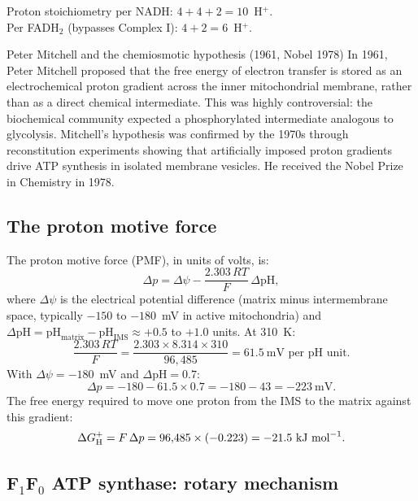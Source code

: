 \documentclass[12pt, a4paper, oneside]{report}
\begin{document}
Proton stoichiometry per NADH: $4 + 4 + 2 = 10$~H$^+$.\\
Per FADH$_2$ (bypasses Complex I): $4 + 2 = 6$~H$^+$.

\begin{historicalnote}{Peter Mitchell and the chemiosmotic hypothesis (1961, Nobel 1978)}
  In 1961, Peter Mitchell proposed that the free energy of electron
  transfer is stored as an electrochemical proton gradient across the
  inner mitochondrial membrane, rather than as a direct chemical
  intermediate. This was highly controversial: the biochemical
  community expected a phosphorylated intermediate analogous to
  glycolysis. Mitchell's hypothesis was confirmed by the 1970s through
  reconstitution experiments showing that artificially imposed proton
  gradients drive ATP synthesis in isolated membrane vesicles.
  He received the Nobel Prize in Chemistry in 1978.
\end{historicalnote}

\subsection{The proton motive force}

The proton motive force (PMF), in units of volts, is:
\begin{equation}
  \Delta p = \Delta\psi - \frac{2.303\,RT}{F}\,\Delta\mathrm{pH},
  \label{eq:pmf}
\end{equation}
where $\Delta\psi$ is the electrical potential difference (matrix minus
intermembrane space, typically $-150$ to $-180$~mV in active
mitochondria) and $\Delta\mathrm{pH} = \mathrm{pH}_\text{matrix} -
\mathrm{pH}_\text{IMS} \approx +0.5$ to $+1.0$ units. At 310~K:
\[
  \frac{2.303\,RT}{F} = \frac{2.303 \times 8.314 \times 310}{96{,}485}
  = 61.5~\text{mV per pH unit.}
\]
With $\Delta\psi = -180$~mV and $\Delta\mathrm{pH} = 0.7$:
\[
  \Delta p = -180 - 61.5\times 0.7 = -180 - 43 = -223~\text{mV}.
\]
The free energy required to move one proton from the IMS to the matrix
against this gradient:
\begin{equation}
  \Delta G_\text{H}^+ = F\,\Delta p = 96{,}485 \times (-0.223)
  = -21.5~\text{kJ~mol}^{-1}.
  \label{eq:dgh}
\end{equation}

\subsection{F$_1$F$_0$ ATP synthase: rotary mechanism}
\end{document}
